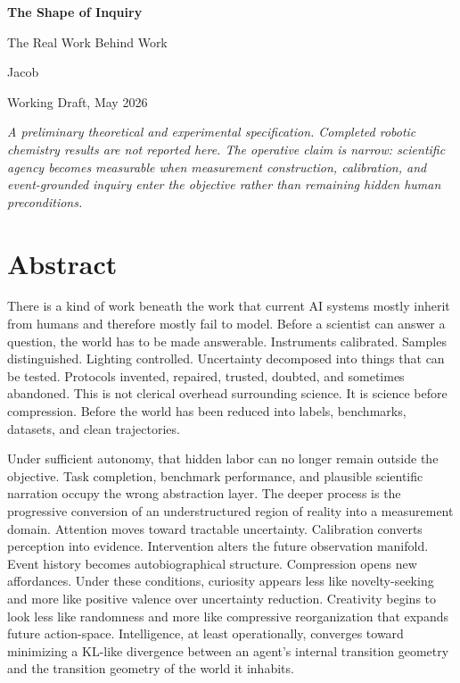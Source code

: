 \documentclass[11pt]{article}
\begin{document}
\begin{titlepage}
\centering
\vspace*{0.60in}
{\Huge\bfseries The Shape of Inquiry\par}
\vspace{0.20in}
{\Large The Real Work Behind Work\par}
\vspace{0.38in}
{\large Jacob\par}
{\small Working Draft, May 2026\par}
\vfill
\begin{minipage}{0.80\textwidth}
\small
\textit{A preliminary theoretical and experimental specification. Completed robotic chemistry results are not reported here. The operative claim is narrow: scientific agency becomes measurable when measurement construction, calibration, and event-grounded inquiry enter the objective rather than remaining hidden human preconditions.}
\end{minipage}
\vfill
\end{titlepage}

\section*{Abstract}

There is a kind of work beneath the work that current AI systems mostly inherit from humans and therefore mostly fail to model. Before a scientist can answer a question, the world has to be made answerable. Instruments calibrated. Samples distinguished. Lighting controlled. Uncertainty decomposed into things that can be tested. Protocols invented, repaired, trusted, doubted, and sometimes abandoned. This is not clerical overhead surrounding science. It is science before compression. Before the world has been reduced into labels, benchmarks, datasets, and clean trajectories.

Under sufficient autonomy, that hidden labor can no longer remain outside the objective. Task completion, benchmark performance, and plausible scientific narration occupy the wrong abstraction layer. The deeper process is the progressive conversion of an understructured region of reality into a measurement domain. Attention moves toward tractable uncertainty. Calibration converts perception into evidence. Intervention alters the future observation manifold. Event history becomes autobiographical structure. Compression opens new affordances. Under these conditions, curiosity appears less like novelty-seeking and more like positive valence over uncertainty reduction. Creativity begins to look less like randomness and more like compressive reorganization that expands future action-space. Intelligence, at least operationally, converges toward minimizing a KL-like divergence between an agent's internal transition geometry and the transition geometry of the world it inhabits.
\end{document}

